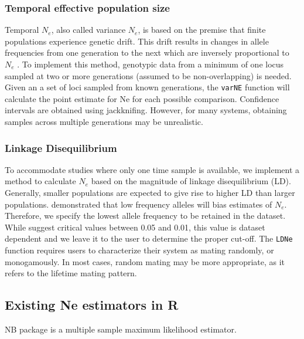 \documentclass[english,titlepage]{article}
\begin{document}
\subsubsection*{Temporal effective population size}

Temporal $N_e$, also called variance $N_e$, is based on the premise that finite populations experience genetic drift. This drift results in changes in allele frequencies from one generation to the next which are inversely proportional to $N_e$ \citep{Nei1981}. To implement this method, genotypic data from a minimum of one locus sampled at two or more generations (assumed to be non-overlapping) is needed.  Given an a set of loci sampled from known generations, the \texttt{varNE} function will calculate the point estimate for Ne for each possible comparison. Confidence intervals are obtained using jackknifing. However, for many systems, obtaining samples across multiple generations may be unrealistic.

\subsubsection*{Linkage Disequilibrium}

To accommodate studies where only one time sample is available, we implement a method to calculate $N_e$ based on the magnitude of linkage disequilibrium (LD). Generally, smaller populations are expected to give rise to higher LD than larger populations. 
\cite{Waples2006} demonstrated that low frequency alleles will bias estimates of $N_e$. Therefore, we specify the lowest allele frequency to be retained in the dataset.  While \cite{Waples2008} suggest critical values between 0.05 and 0.01, this value is dataset dependent and we leave it to the user to determine the proper cut-off. The \texttt{LDNe} function requires users to characterize their system as mating randomly, or monogamously. In most cases, random mating may be more appropriate, as it refers to the lifetime mating pattern. 

\subsection{Existing Ne estimators in R}
NB package is a multiple sample maximum likelihood estimator\citep{Hui2014}.
  


\end{document}
